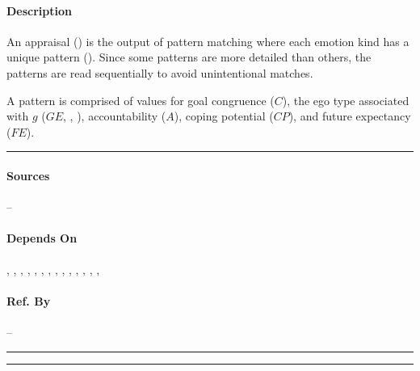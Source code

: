 \paragraph{Description} An appraisal () is the output of
pattern matching where each emotion kind has a unique pattern
(). Since some patterns are more detailed than others, the
patterns are read sequentially to avoid unintentional matches.

A pattern is comprised of values for goal congruence ($C$), the ego type
associated with $g$ ($GE$, , ),
accountability ($A$), coping potential ($CP$), and future expectancy
($FE$).\\\hrule

\paragraph{Sources} --

\paragraph{Depends On} , , 
, , , , 
, , , 
, , 
, , 
, 

\paragraph{Ref. By} -- \\\hrule\vspace{0.5mm}\hrule

~\newline


